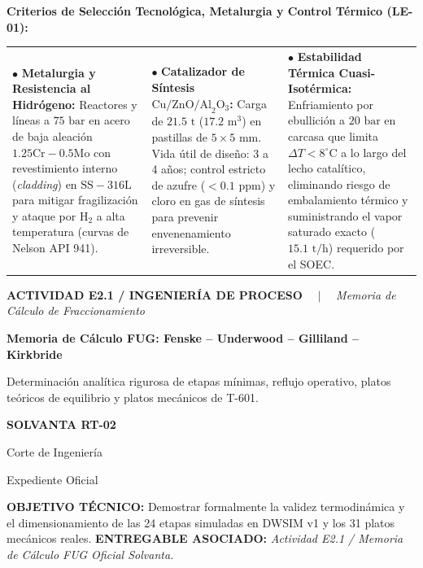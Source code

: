 \documentclass[10pt,landscape]{article}
\newcommand{\slideheader}[4]{%
  \noindent
  \begin{minipage}[c]{0.78\textwidth}
    {\fontsize{7pt}{8.5pt}\selectfont \textbf{\color{accentcyan}#1} \ \ $|$ \ \ \textit{\color{black!70}#2}}\par
    \vspace{1.5pt}
    {\fontsize{12pt}{14pt}\selectfont \textbf{\color{navyblue}#3}}\par
    \vspace{1.5pt}
    {\fontsize{7.2pt}{8.8pt}\selectfont \color{black!80}#4}
  \end{minipage}
  \hfill
  \begin{minipage}[c]{0.20\textwidth}
    \begin{tcolorbox}[colback=navyblue,colframe=navyblue,arc=1.5mm,boxrule=0pt,top=2.5pt,bottom=2.5pt,left=4pt,right=4pt]
      \centering
      {\color{white}\fontsize{7.5pt}{9pt}\selectfont \textbf{SOLVANTA RT-02}}\par
      \vspace{1pt}
      {\color{accentcyan}\fontsize{6pt}{7.5pt}\selectfont Corte de Ingeniería}\par
      {\color{white!80}\fontsize{5.5pt}{7pt}\selectfont Expediente Oficial}
    \end{tcolorbox}
  \end{minipage}
  \par\vspace{2pt}
  \noindent{\color{navyblue}\rule{\textwidth}{1.0pt}}
  \par\vspace{2pt}
}
\newenvironment{objectivebox}[2]{%
  \begin{tcolorbox}[
    colback=softblue,
    colframe=accentcyan,
    arc=1.5mm,
    boxrule=0.7pt,
    top=2pt,
    bottom=2pt,
    left=6pt,
    right=6pt
  ]
    \noindent
    \textbf{\fontsize{6.5pt}{7.8pt}\selectfont \color{navyblue}OBJETIVO TÉCNICO:} 
    {\fontsize{6.5pt}{7.8pt}\selectfont #1}
    \hfill
    \textbf{\fontsize{6.5pt}{7.8pt}\selectfont \color{navyblue}ENTREGABLE ASOCIADO:} 
    {\fontsize{6.5pt}{7.8pt}\selectfont \textit{#2}}
  \end{tcolorbox}
  \vspace{1.5pt}
}{}
\begin{document}
\begin{tcolorbox}[colback=white,colframe=navyblue!60,arc=1.5mm,boxrule=0.7pt,top=3pt,bottom=3pt,left=6pt,right=6pt]
  \textbf{\fontsize{8pt}{9.2pt}\selectfont \color{navyblue}Criterios de Selección Tecnológica, Metalurgia y Control Térmico (LE-01):}\par\vspace{2pt}
  \scriptsize
  \begin{tabularx}{\linewidth}{X X X}
    $\bullet$ \textbf{Metalurgia y Resistencia al Hidrógeno:} \newline
    Reactores y líneas a $75\text{ bar}$ en acero de baja aleación $1.25\text{Cr}-0.5\text{Mo}$ con revestimiento interno (\textit{cladding}) en $\text{SS}-316\text{L}$ para mitigar fragilización y ataque por $\text{H}_2$ a alta temperatura (curvas de Nelson API 941). &
    $\bullet$ \textbf{Catalizador de Síntesis $\text{Cu/ZnO/Al}_2\text{O}_3$:} \newline
    Carga de $21.5\text{ t}$ ($17.2\text{ m}^3$) en pastillas de $5\times 5\text{ mm}$. Vida útil de diseño: 3 a 4 años; control estricto de azufre ($< 0.1\text{ ppm}$) y cloro en gas de síntesis para prevenir envenenamiento irreversible. &
    $\bullet$ \textbf{Estabilidad Térmica Cuasi-Isotérmica:} \newline
    Enfriamiento por ebullición a $20\text{ bar}$ en carcasa que limita $\Delta T < 8^\circ\text{C}$ a lo largo del lecho catalítico, eliminando riesgo de embalamiento térmico y suministrando el vapor saturado exacto ($15.1\text{ t/h}$) requerido por el SOEC.
  \end{tabularx}
\end{tcolorbox}

\newpage

\slideheader{ACTIVIDAD E2.1 / INGENIERÍA DE PROCESO}{Memoria de Cálculo de Fraccionamiento}{Memoria de Cálculo FUG: Fenske -- Underwood -- Gilliland -- Kirkbride}{Determinación analítica rigurosa de etapas mínimas, reflujo operativo, platos teóricos de equilibrio y platos mecánicos de T-601.}

\begin{objectivebox}{Demostrar formalmente la validez termodinámica y el dimensionamiento de las 24 etapas simuladas en DWSIM v1 y los 31 platos mecánicos reales.}{Actividad E2.1 / Memoria de Cálculo FUG Oficial Solvanta.}
\end{objectivebox}
\end{document}

